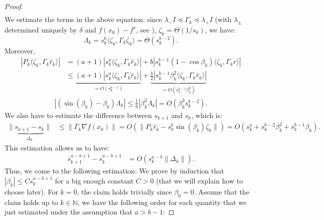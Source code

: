 \documentclass{article}
\theoremstyle{plain}
\theoremstyle{definition}
\theoremstyle{remark}
\newcommand{\innp}[2]{\langle #1, #2 \rangle}
\newcommand*{\NN}{\mathbb{N}}
\begin{document}
\begin{proof}
\begin{equation*}
\begin{aligned}
        \end{aligned}
    \end{equation*}
    We estimate the terms in the above equation: since $\lambda_- I \preceq \Gamma_k \preceq \lambda_+ I$ (with $\lambda_\pm$ determined uniquely by $\delta$ and $f(x_0) - f^\star$, see ), $\zeta_k = \Theta(1/s_k)$, we have:
    \begin{equation*}
        \Lambda_k = s_k^b \innp{\zeta_k}{\Gamma_k\zeta_k} = \Theta(s_k^{b - 2}).
    \end{equation*}
    Moreover,
    \begin{equation*}
        \begin{aligned}
            |P_k\innp{\zeta_k}{\Gamma_k\hat{r}_k}| &= (a+1)|s_k^{a} \innp{\zeta_k}{\Gamma_k\hat{r}_k}| + b|s_k^{b-1}(1 - \cos\beta_k) \innp{\zeta_k}{\Gamma_k\hat{r}}| \\
            &\leq \underbrace{(a+1)|s_k^{a} \innp{\zeta_k}{\Gamma_k\hat{r}_k}|}_{= O(s_k^{a - 1})} + \underbrace{\frac{b}{2}|s_k^{b-1}\beta_k^2 \innp{\zeta_k}{\Gamma_k\hat{r}_k}|}_{=O(s_k^{b - 1}\beta_k^2)}
        \end{aligned} 
    \end{equation*}
    \begin{equation*}
        \begin{aligned}
            |(\sin(\beta_k) - \beta_k)\Lambda_k| \leq \frac{1}{6}|\beta_k^3\Lambda_k| = O(\beta_k^3s_k^{b - 2}).
        \end{aligned}
    \end{equation*}
    We also have to estimate the difference between $s_{k + 1}$ and $s_k$, which is:
    \begin{equation*}
        \begin{aligned}
            \|\underbrace{s_{k + 1} - s_k}_{\Delta_k}\| &\leq \|\Gamma_k\nabla f(x_k)\| = O(\|P_k \hat{r}_k - s_k^b \sin (\beta_k) \zeta_k\|) = O(s_k^a + s_k^{b - 2}\beta_k^2 + s_k^{b - 1}\beta_k).
        \end{aligned}
    \end{equation*}
    This estimation allows us to have:
    \begin{equation*}
        \begin{aligned}
            s_{k+1}^{a - b + 1} - s_k^{a - b + 1} &= O(s_k^{a - b}\|\Delta_k\|).
        \end{aligned}
    \end{equation*}
    Thus, we come to the following estimation: We prove by induction that $|\beta_k| \leq Cs_k^{a - b + 1}$ for a big enough constant $C > 0$ (that we will explain how to choose later). For $k = 0$, the claim holds trivially since $\beta_0 = 0$. Assume that the claim holds up to $k \in \NN$, we have the following order for each quantity that we just estimated under the assumption that $a > b - 1$:

\end{proof}
\end{document}
